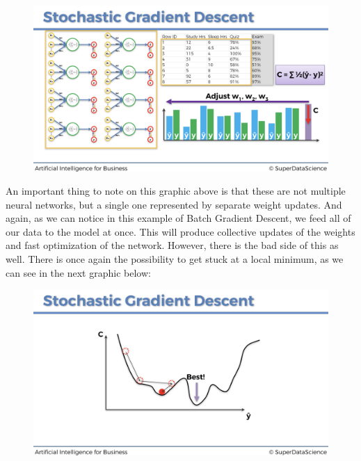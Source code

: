 \documentclass[]{book}
\begin{document}
\newpage

\begin{figure}[!htbp]
        \begin{center}
            \includegraphics[scale=0.18]{ANN_26.png}
        \end{center}
\end{figure}

An important thing to note on this graphic above is that these are not multiple neural networks, but a single one represented by separate weight updates. And again, as we can notice in this example of Batch Gradient Descent, we feed all of our data to the model at once. This will produce collective updates of the weights and fast optimization of the network. However, there is the bad side of this as well. There is once again the possibility to get stuck at a local minimum, as we can see in the next graphic below:

\begin{figure}[!htbp]
        \begin{center}
            \includegraphics[scale=0.18]{ANN_30.png}
        \end{center}
\end{figure}
\end{document}

